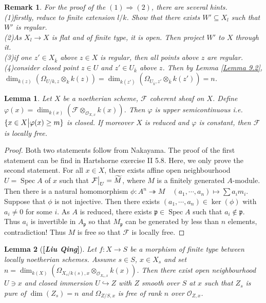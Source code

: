 \documentclass{ctexart}
\newtheorem{remark}{Remark}[section]
\newtheorem{lemma}{Lemma}[section]
\newcommand{\spec}{\operatorname{Spec}}
\begin{document}
\begin{remark}
    For the proof of the $(1) \Rightarrow (2)$, there are several hints. \\
    (1)firstly, reduce to finite extension $l/k$.
    Show that there exists $W' \subseteq X_{l}$ such that $W'$ is regular. \\
    (2)As $X_{l} \longrightarrow X$ is flat and of finite type, it is open.
    Then project $W'$ to $X$ through it. \\
    (3)if one $z'\in X_{\overline{k}}$ above $z\in X$ is regular, then all points above $z$ are regular. \\
    (4)consider closed point $z\in U$ and $z'\in U_{\overline{k}}$ above $z$.
    Then by Lemma \ref{Lemma 9.2}, $\dim_{k(z)}(\Omega_{U/k, z} \otimes_{k} k(z)) = \dim_{k(z')}(\Omega_{U_{\overline{k}}, z'} \otimes_{\overline{k}} k(z')) = n$. 
\end{remark}
\begin{lemma}
    Let $X$ be a noetherian scheme, $\mathcal{F}$ coherent sheaf on $X$.
    Define $\varphi(x) = \dim_{k(x)}(\mathcal{F} \otimes_{\mathcal{O}_{X, x}} k(x))$.
    Then $\varphi$ is upper semicontinuous i.e. $\{x\in X \big{|} \varphi(x) \ge m\}$ is closed.
    If moreover $X$ is reduced and $\varphi$ is constant, then $\mathcal{F}$ is locally free.
    \label{Lemma 9.4}
\end{lemma}
\begin{proof}
    Both two statements follow from Nakayama.
    The proof of the first statement can be find in Hartshorne exercise II 5.8.
    Here, we only prove the second statement.
    For all $x\in X$, there exists affine open neighbourhood $U = \spec A$ of $x$ such that $\mathcal{F}\big{|}_{U} = \widetilde{M}$, where $M$ is a finitely generated $A$-module.
    Then there is a natural homomorphism $\phi: A^{n} \twoheadrightarrow M\quad (a_{1}, \cdots, a_{n}) \longmapsto \sum a_{i}m_{i}$.
    Suppose that $\phi$ is not injective.
    Then there exists $(a_{1}, \cdots, a_{n})\in \ker(\phi)$ with $a_{i} \neq 0$ for some $i$.
    As $A$ is reduced, there exists $\mathfrak{p}\in \spec A$ such that $a_{i}\notin \mathfrak{p}$.
    Thus $a_{i}$ is invertible in $A_{\mathfrak{p}}$ so that $M_{\mathfrak{p}}$ can be generated by less than $n$ elements, contradiction!
    Thus $M$ is free so that $\mathcal{F}$ is locally free.
\end{proof}
\begin{lemma}[\textbf{[\emph{Liu Qing}]}]
    Let $f: X \longrightarrow S$ be a morphism of finite type between locally noetherian schemes.
    Assume $s\in S$, $x\in X_{s}$ and set $n = \dim_{k(X)}(\Omega_{X_{s}/k(s), x} \otimes_{\mathcal{O}_{X_{s}, x}} k(x))$.
    Then there exist open neighbourhood $U\ni x$ and closed immersion $U \hookrightarrow Z$ with $Z$ smooth over $S$ at $x$ such that $Z_{s}$ is pure of $\dim(Z_{s}) = n$ and $\Omega_{Z/S, x}$ is free of rank $n$ over $\mathcal{O}_{Z, x}$.
    \label{Lemma 9.5}
\end{lemma}
\end{document}
